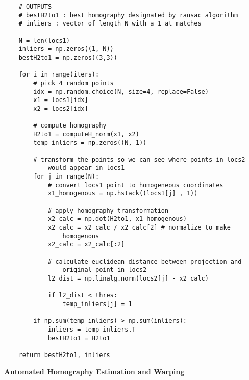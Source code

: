 \documentclass[12pt,letterpaper, onecolumn]{exam}
\begin{document}
\begin{questions}
\begin{solution}
\begin{verbatim}
    # OUTPUTS
    # bestH2to1 : best homography designated by ransac algorithm
    # inliers : vector of length N with a 1 at matches
    
    N = len(locs1)
    inliers = np.zeros((1, N))
    bestH2to1 = np.zeros((3,3))
    
    for i in range(iters):
        # pick 4 random points
        idx = np.random.choice(N, size=4, replace=False)
        x1 = locs1[idx]
        x2 = locs2[idx]

        # compute homography
        H2to1 = computeH_norm(x1, x2)
        temp_inliers = np.zeros((N, 1))
    
        # transform the points so we can see where points in locs2
            would appear in locs1
        for j in range(N):
            # convert locs1 point to homogeneous coordinates
            x1_homogenous = np.hstack((locs1[j] , 1))
    
            # apply homography transformation
            x2_calc = np.dot(H2to1, x1_homogenous)
            x2_calc = x2_calc / x2_calc[2] # normalize to make
                homogenous
            x2_calc = x2_calc[:2]
    
            # calculate euclidean distance between projection and
                original point in locs2
            l2_dist = np.linalg.norm(locs2[j] - x2_calc)
    
            if l2_dist < thres:
                temp_inliers[j] = 1
    
        if np.sum(temp_inliers) > np.sum(inliers):
            inliers = temp_inliers.T
            bestH2to1 = H2to1
    
    return bestH2to1, inliers
        \end{verbatim}
    \end{solution}

    \pagebreak

    \begingroup
    \large \textbf{Automated Homography Estimation and Warping}
    \endgroup


\end{questions}
\end{document}
